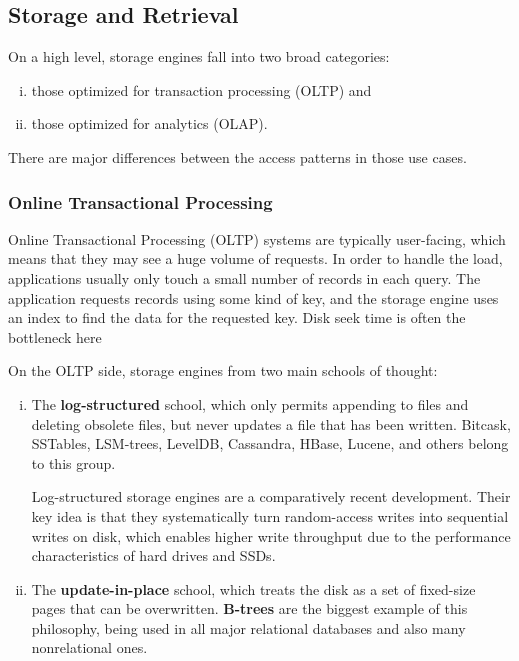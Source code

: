 \documentclass{article}
\begin{document}
    \subsection{Storage and Retrieval }
    On a high level, storage engines fall into two broad categories: 
    \begin{enumerate}[i.]
        \item  those optimized for transaction processing (OLTP) and
        \item those optimized for analytics (OLAP).
    \end{enumerate}
    
    There are major differences between the access patterns in those use cases.
    
    \subsubsection{Online Transactional Processing}
    Online Transactional Processing (OLTP) systems are typically user-facing, which means that they may see a huge volume of requests. In order to handle the load, applications usually only touch a small number of records in each query. The application requests records using some kind of key, and the storage engine uses an index to find the data for the requested key. Disk seek time is often the bottleneck here
    
    On the OLTP side, storage engines from two main schools of thought:
    
    \begin{enumerate}[i.]
        \item The \textbf{log-structured} school, which only permits appending to files and deleting obsolete files, but never updates a file that has been written. Bitcask, SSTables, LSM-trees, LevelDB, Cassandra, HBase, Lucene, and others belong to this group.
        
        Log-structured storage engines are a comparatively recent development. Their key idea is that they systematically turn random-access writes into sequential writes on disk, which enables higher write throughput due to the performance characteristics of hard drives and SSDs.
        
        \item The \textbf{update-in-place} school, which treats the disk as a set of fixed-size pages that can be overwritten. \textbf{B-trees} are the biggest example of this philosophy, being used in all major relational databases and also many nonrelational ones.
    \end{enumerate}
    
\end{document}
